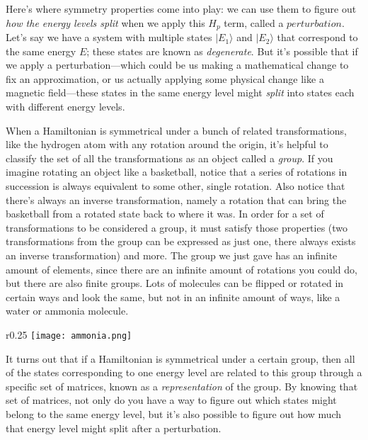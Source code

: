 Here's where symmetry properties come into play: we can use them to figure out \emph{how the energy levels split} when we apply this $H_p$ term, called a $perturbation$. Let's say we have a system with multiple states $|E_1\rangle$ and $|E_2\rangle$ that correspond to the same energy $E$; these states are known as \emph{degenerate}. But it's possible that if we apply a perturbation---which could be us making a mathematical change to fix an approximation, or us actually applying some physical change like a magnetic field---these states in the same energy level might \emph{split} into states each with different energy levels.

When a Hamiltonian is symmetrical under a bunch of related transformations, like the hydrogen atom with any rotation around the origin, it's helpful to classify the set of all the transformations as an object called a \emph{group}. If you imagine rotating an object like a basketball, notice that a series of rotations in succession is always equivalent to some other, single rotation. Also notice that there's always an inverse transformation, namely a rotation that can bring the basketball from a rotated state back to where it was. In order for a set of transformations to be considered a group, it must satisfy those properties (two transformations from the group can be expressed as just one, there always exists an inverse transformation) and more. The group we just gave has an infinite amount of elements, since there are an infinite amount of rotations you could do, but there are also finite groups. Lots of molecules can be flipped or rotated in certain ways and look the same, but not in an infinite amount of ways, like a water or ammonia molecule.

\begin{wrapfigure}{r}{0.25\textwidth}
    \centering
    \texttt{[image: ammonia.png]}
\end{wrapfigure}

It turns out that if a Hamiltonian is symmetrical under a certain group, then all of the states corresponding to one energy level are related to this group through a specific set of matrices, known as a \emph{representation} of the group. By knowing that set of matrices, not only do you have a way to figure out which states might belong to the same energy level, but it's also possible to figure out how much that energy level might split after a perturbation.

